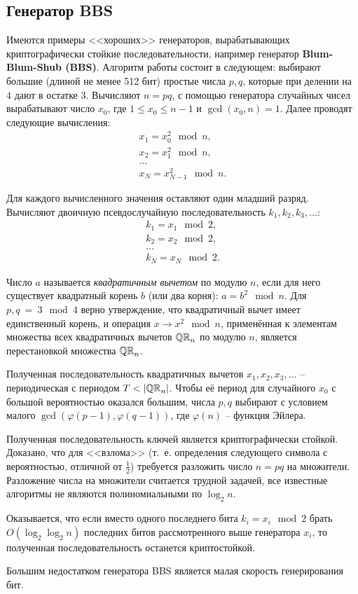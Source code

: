 \subsection{Генератор BBS}

Имеются примеры <<хороших>> генераторов, вырабатывающих криптографически стойкие последовательности, например генератор \textbf{Blum-Blum-Shub (BBS)}. Алгоритм работы состоит в следующем: выбирают большие (длиной не менее 512 бит) простые числа $p, q$, которые при делении на $4$ дают в остатке $3$. Вычисляют $n = p q$, с помощью генератора случайных чисел вырабатывают число $x_{0}$, где $1 \leq x_0 \leq n-1$ и $\gcd(x_0, n) = 1$. Далее проводят следующие вычисления:
\[ \begin{array}{l}
        x_{1} = x_{0}^{2} \mod n,\\
        x_{2} = x_{1}^{2} \mod n,\\
        \dots\\
        x_{N} = x_{N-1}^{2} \mod n.
\end{array} \]

Для каждого вычисленного значения оставляют один младший разряд. Вычисляют двоичную псевдослучайную последовательность $k_1, k_2, k_3, \dots$:
\[ \begin{array}{l}
        k_{1} = x_{1} \mod 2,\\
        k_{2} = x_{2} \mod 2,\\
        \dots \\
        k_{N} = x_{N} \mod 2.
\end{array} \]

Число $a$ называется \emph{квадратичным вычетом} по модулю $n$, если для него существует квадратный корень $b$ (или два корня): $a = b^2 \mod n$. Для $p,q ~=~ 3 \mod 4$ верно утверждение, что квадратичный вычет имеет единственный корень, и операция $x \rightarrow x^2 \mod n$, применённая к элементам множества всех квадратичных вычетов $\mathbb{QR}_n$ по модулю $n$, является перестановкой множества $\mathbb{QR}_n$.

Полученная последовательность квадратичных вычетов $x_1, x_2, x_3, \dots$ -- периодическая с периодом $T < |\mathbb{QR}_n|$. Чтобы её период для случайного $x_0$ с большой вероятностью оказался большим, числа $p,q$ выбирают с условием малого $\gcd(\varphi(p-1), \varphi(q-1))$, где $\varphi(n)$ -- функция Эйлера.

Полученная последовательность ключей является криптографически стойкой. Доказано, что для <<взлома>> (т.~е. определения следующего символа с вероятностью, отличной от $\frac{1}{2}$) требуется разложить число $n=pq$ на множители. Разложение числа на множители считается трудной задачей, все известные алгоритмы не являются полиномиальными по $\log_2 n$.

Оказывается, что если вместо одного последнего бита $k_i = x_i \mod 2$ брать $O(\log_2 \log_2 n)$ последних битов рассмотренного выше генератора $x_i$, то полученная последовательность останется криптостойкой.

Большим недостатком генератора BBS является малая скорость генерирования бит.
